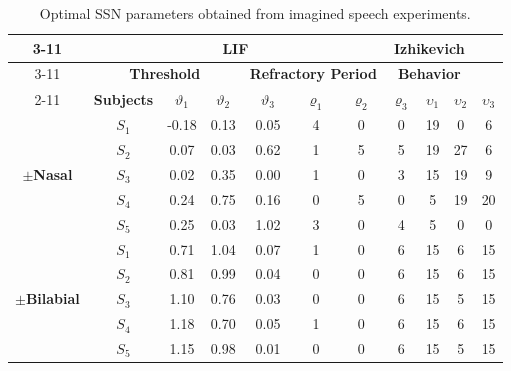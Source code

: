 \begin{table}[h!]
	\centering
	\caption{Optimal SSN parameters obtained from imagined speech experiments.}
	\begin{tabular}{|*{11}{c|}}
		\cline{3-11}
		\multicolumn{2}{c|}{\multirow{1}{*}} & \multicolumn{6}{c|}{\textbf{LIF}} & \multicolumn{3}{c|}{\textbf{Izhikevich}} \\\cline{3-11}
		\multicolumn{2}{c|}{\multirow{1}{*}} & \multicolumn{3}{c|}{\textbf{Threshold}} & \multicolumn{3}{c|}{\textbf{Refractory Period}} & \multicolumn{3}{c|}{\textbf{Behavior}} \\\cline{2-11}
		\multicolumn{1}{c|}{\multirow{1}{*}} & \textbf{Subjects} & \multicolumn{1}{c|}{\boldmath$\vartheta_{1}$} & \multicolumn{1}{c|}{\boldmath$\vartheta_{2}$} & \multicolumn{1}{c|}{\boldmath$\vartheta_{3}$} & \multicolumn{1}{c|}{\boldmath$\varrho_{1}$} & \multicolumn{1}{c|}{\boldmath$\varrho_{2}$} & \multicolumn{1}{c|}{\boldmath$\varrho_{3}$} & \multicolumn{1}{c|}{\boldmath$\upsilon_{1}$} & \multicolumn{1}{c|}{\boldmath$\upsilon_{2}$} & \multicolumn{1}{c|}{\boldmath$\upsilon_{3}$} \\\hline
		\multirow{5}{*}{\begin{sideways}\boldmath$\pm$\textbf{Nasal}\end{sideways}} & \boldmath$S_{1}$ & -0.18 & 0.13  & 0.05  & 4     & 0    & 0    & 19    & 0     & 6 \\\cline{2-11}
		& \boldmath$S_{2}$ & 0.07  & 0.03  & 0.62  & 1     & 5     & 5     & 19    & 27    & 6 \\\cline{2-11}
		& \boldmath$S_{3}$ & 0.02  & 0.35  & 0.00  & 1     & 0     & 3     & 15    & 19    & 9 \\\cline{2-11}
		& \boldmath$S_{4}$ & 0.24  & 0.75  & 0.16  & 0     & 5     & 0    & 5     & 19    & 20 \\\cline{2-11}
		& \boldmath$S_{5}$ & 0.25  & 0.03  & 1.02  & 3     & 0    & 4     & 5     & 0     & 0 \\\hline
		\multirow{5}{*}{\begin{sideways}\boldmath$\pm$\textbf{Bilabial}\end{sideways}} & \boldmath$S_{1}$ & 0.71  & 1.04  & 0.07  & 1     & 0     & 6     & 15    & 6     & 15 \\\cline{2-11}
		& \boldmath$S_{2}$ & 0.81  & 0.99  & 0.04  & 0     & 0     & 6     & 15    & 6     & 15 \\\cline{2-11}
		& \boldmath$S_{3}$ & 1.10  & 0.76  & 0.03  & 0     & 0    & 6     & 15    & 5     & 15 \\\cline{2-11}
		& \boldmath$S_{4}$ & 1.18  & 0.70  & 0.05  & 1     & 0     & 6     & 15    & 6     & 15 \\\cline{2-11}
		& \boldmath$S_{5}$ & 1.15  & 0.98  & 0.01  & 0    & 0     & 6     & 15    & 5     & 15 \\\hline
	\end{tabular}%
	\label{Table: SSN_Optimal_Imagined}%
\end{table}%

